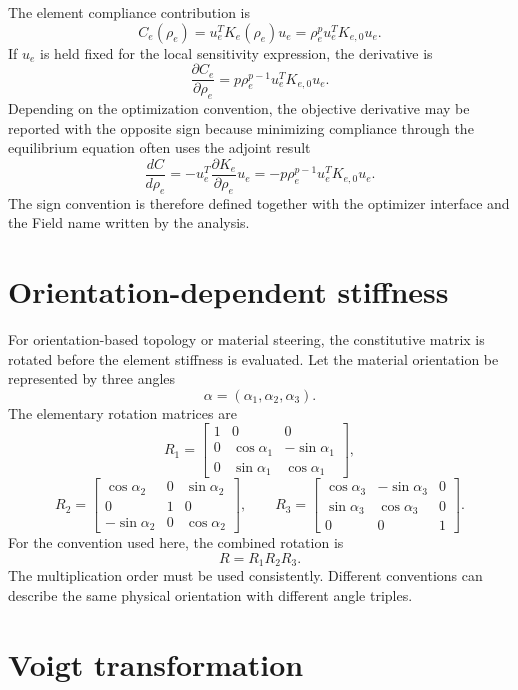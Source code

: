 The element compliance contribution is
\[
C_e(\rho_e) = u_e^T K_e(\rho_e) u_e
=
\rho_e^p u_e^T K_{e,0} u_e .
\]
If \(u_e\) is held fixed for the local sensitivity expression, the derivative is
\[
\frac{\partial C_e}{\partial \rho_e}
=
p\rho_e^{p-1} u_e^T K_{e,0} u_e .
\]
Depending on the optimization convention, the objective derivative may be reported with the opposite sign because minimizing compliance through the equilibrium equation often uses the adjoint result
\[
\frac{dC}{d\rho_e}
=
-u_e^T \frac{\partial K_e}{\partial \rho_e}u_e
=
-p\rho_e^{p-1}u_e^T K_{e,0}u_e .
\]
The sign convention is therefore defined together with the optimizer interface and the Field name written by the analysis.

\section{Orientation-dependent stiffness}

For orientation-based topology or material steering, the constitutive matrix is rotated before the element stiffness is evaluated. Let the material orientation be represented by three angles
\[
\alpha = (\alpha_1,\alpha_2,\alpha_3).
\]
The elementary rotation matrices are
\[
R_1 =
\begin{bmatrix}
1 & 0 & 0\\
0 & \cos\alpha_1 & -\sin\alpha_1\\
0 & \sin\alpha_1 & \cos\alpha_1
\end{bmatrix},
\]
\[
R_2 =
\begin{bmatrix}
\cos\alpha_2 & 0 & \sin\alpha_2\\
0 & 1 & 0\\
-\sin\alpha_2 & 0 & \cos\alpha_2
\end{bmatrix},
\qquad
R_3 =
\begin{bmatrix}
\cos\alpha_3 & -\sin\alpha_3 & 0\\
\sin\alpha_3 & \cos\alpha_3 & 0\\
0 & 0 & 1
\end{bmatrix}.
\]
For the convention used here, the combined rotation is
\[
R = R_1R_2R_3 .
\]
The multiplication order must be used consistently. Different conventions can describe the same physical orientation with different angle triples.

\section{Voigt transformation}

